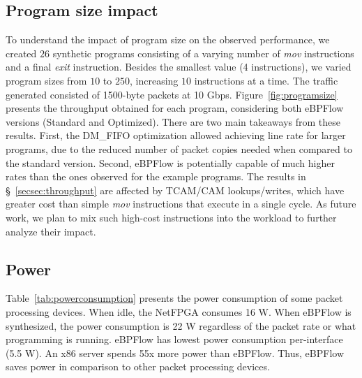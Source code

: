 \subsection{Program size impact}

To understand the impact of program size on the observed performance, we created $26$ synthetic programs consisting of a varying number of \textit{mov} instructions and a final \textit{exit} instruction. Besides the smallest value (4 instructions), we varied program sizes from $10$ to $250$, increasing $10$ instructions at a time. The traffic generated consisted of 1500-byte packets at 10 Gbps. Figure~\ref{fig:programsize} presents the throughput obtained for each program, considering both eBPFlow versions (Standard and Optimized). There are two main takeaways from these results. First, the DM\_FIFO optimization allowed achieving line rate for larger programs, due to the reduced number of packet copies needed when compared to the standard version. Second, eBPFlow is potentially capable of much higher rates than the ones observed for the example programs. The results in \S~\ref{secsec:throughput} are affected by TCAM/CAM lookups/writes, which have greater cost than simple \textit{mov} instructions that execute in a single cycle. As future work, we plan to mix such high-cost instructions into the workload to further analyze their impact.




\subsection{Power}
\label{sec:power}


Table~\ref{tab:powerconsumption} presents the power consumption of some packet processing devices. When idle, the NetFPGA consumes 16 W. When eBPFlow is synthesized, the power consumption is 22 W regardless of the packet rate or what programming is running. 
eBPFlow has lowest power consumption per-interface (5.5 W).
An x86 server spends 55x more power than eBPFlow.
Thus, eBPFlow saves power in comparison to other packet processing devices.


